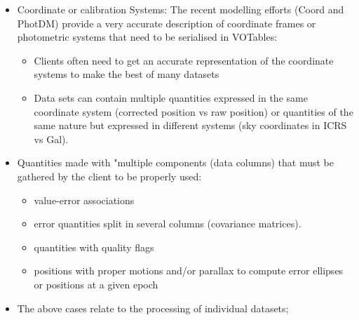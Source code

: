 \begin{itemize}
  \item Coordinate or calibration Systems: The recent modelling efforts (Coord and PhotDM) provide a very accurate description of coordinate frames or photometric systems that need to be serialised in VOTables:
  \begin{itemize}
    \item Clients often need to get an accurate representation of the coordinate systems to make the best of many datasets  
    \item Data sets can contain multiple quantities expressed in the same coordinate system (corrected position vs raw position) or 
             quantities of the same nature but expressed in different systems (sky coordinates in ICRS vs Gal). %
  \end{itemize} 
  
  \item Quantities made with "multiple components (data columns) that must be gathered by the client to be properly used:
  \begin{itemize}
    \item value-error associations
    \item error quantities split in several columns (covariance matrices). 
    \item quantities with quality flags
    \item positions with proper motions and/or parallax to compute error ellipses or positions at a given epoch
  \end{itemize} 

  \item The above cases relate to the processing of individual datasets; %
  

\end{itemize}
